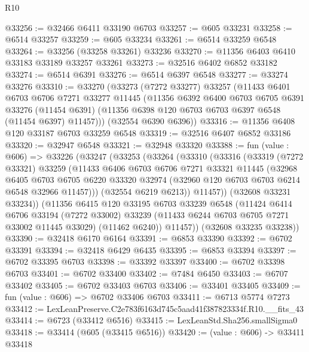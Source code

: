 \begin{lexlean}{R10}
\begin{coremodule}
@33256 := @32466 @6411 @33190 @6703
@33257 := @605 @33231
@33258 := @6514 @33257
@33259 := @605 @33234
@33261 := @6514 @33259 @6548
@33264 := @33256 (@33258 @33261) @33236
@33270 := @11356 @6403 @6410 @33183 @33189 @33257 @33261
@33273 := @32516 @6402 @6852 @33182
@33274 := @6514 @6391
@33276 := @6514 @6397 @6548
@33277 := @33274 @33276
@33310 := @33270
    (@33273
      (@7272 @33277)
      @33257
      (@11433
        @6401
        @6703
        @6706
        @7271
        @33277
        @11445
        (@11356
          @6392
          @6400
          @6703
          @6705
          @6391
          @33276
          (@11454 @6391)
          (@11356 @6398 @120 @6703 @6703 @6397 @6548 (@11454 @6397) @11457)))
      (@32554 @6390 @6396))
@33316 := @11356 @6408 @120 @33187 @6703 @33259 @6548
@33319 := @32516 @6407 @6852 @33186
@33320 := @32947 @6548
@33321 := @32948 @33320
@33388 := fun (value : @606) =>
  @33226
    (@33247
      (@33253
        (@33264
          (@33310
            (@33316
              (@33319
                (@7272 @33321)
                @33259
                (@11433
                  @6406
                  @6703
                  @6706
                  @7271
                  @33321
                  @11445
                  (@32968
                    @6405
                    @6703
                    @6705
                    @6220
                    @33320
                    @32974
                    (@32960 @120 @6703 @6703 @6214 @6548 @32966 @11457)))
                (@32554 @6219 @6213))
              @11457))
          (@32608 @33231 @33234))
        (@11356
          @6415
          @120
          @33195
          @6703
          @33239
          @6548
          (@11424
            @6414
            @6706
            @33194
            (@7272 @33002)
            @33239
            (@11433 @6244 @6703 @6705 @7271 @33002 @11445 @33029)
            (@11462 @6240))
          @11457))
      (@32608 @33235 @33238))
@33390 := @32418 @6170 @6164
@33391 := @6853 @33390
@33392 := @6702 @33391
@33394 := @32418 @6429 @6435
@33395 := @6853 @33394
@33397 := @6702 @33395 @6703
@33398 := @33392 @33397
@33400 := @6702 @33398 @6703
@33401 := @6702 @33400
@33402 := @7484 @6450
@33403 := @6707 @33402
@33405 := @6702 @33403 @6703
@33406 := @33401 @33405
@33409 := fun (value : @606) => @6702 @33406 @6703
@33411 := @6713 @5774 @7273
@33412 := LexLeanPreserve.C2e783f6163d745c5aad41f387823334f.R10.__fits_43
@33414 := @6723 (@33412 @6516)
@33415 := LexLeanStd.Sha256.smallSigma0
@33418 := @33414 (@605 (@33415 @6516))
@33420 := (value : @606) -> @33411 @33418

\end{coremodule}
\end{lexlean}
